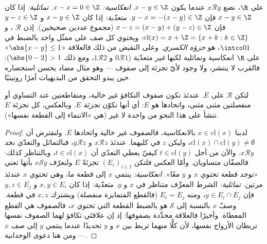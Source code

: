 \begin{example}\label{ex:b1:logic:fracpart}
على $\R$، نضع $x \mathbin{\mathcal{R}} y$ عندما يكون $x - y \in \Z$.
\emph{انعكاسية:} $x - x = 0 \in \Z$. \emph{تماثلية:} إذا كان $x - y
\in \Z$ فإن $y - x = -(x - y) \in \Z$. \emph{متعدّية:} إذا كان $x -
y \in \Z$ و $y - z \in \Z$ فإن $x - z = (x - y) + (y - z) \in
\Z$ (مجموع عددين صحيحين). إذن $\mathcal R$ ، و$\mathrm{cl}(x) = x + \Z = \{x + k : k \in \Z\}$:
ويحتوي كل صف على ممثّل واحد بالضبط في $\intco01$، هو
\emph{جزؤه الكسري}. وعلى النقيض من ذلك فالعلاقة «$\abs{x - y}
\leq 1$» على $\R$ انعكاسية وتماثلية لكنها \emph{غير}
متعدّية ($0 \mathbin{\mathcal R} 1$ و $1 \mathbin{\mathcal R}
2$، ومع ذلك $\abs{0 - 2} > 1$): فالقرب لا ينتشر، ولا وجود
لأيّ تجزئة إلى صفوف --- وهو مثال مضاد يحسن استحضاره حين يبدو
التحقق من البديهيات أمرًا روتينيًا.
\end{example}

\begin{theorem}\label{thm:b1:logic:partition}
لتكن $\mathcal{R}$  على $E$. عندئذ تكون صفوف التكافؤ
غير خالية، ومتقاطعتين عند التساوي أو منفصلتين مثنى مثنى، واتحادها
هو $E$: أي أنها تكوّن \emph{تجزئة}  $E$.
وبالعكس، كل تجزئة  $E$ تنشأ على هذا النحو من  واحدة
لا غير (هي «الانتماء إلى القطعة نفسها»).
\end{theorem}

\begin{proof}
لدينا $x \in \mathrm{cl}(x)$ بالانعكاسية، فالصفوف غير خالية
واتحادها $E$. ولنفترض أن $\mathrm{cl}(x) \cap \mathrm{cl}(y) \neq \emptyset$،
وليكن $z$ في كليهما. عندئذ $x \mathbin{\mathcal{R}} z$ و $y
\mathbin{\mathcal{R}} z$، فبالتماثل والتعدّي نجد $x
\mathbin{\mathcal{R}} y$. والآن من أجل $t \in \mathrm{cl}(y)$ كيفيّ
يعطي التعدّي أن $t \in \mathrm{cl}(x)$، وبالتناظر كذلك: فالصفّان
متساويان. وأمّا العكس فلتكن $(E_i)_{i \in I}$ تجزئةً  $E$ ولنعرّف $x \mathbin{\mathcal S} y$ بأنها تعني
«توجد قطعة تحتوي $x$ و $y$ معًا». \emph{انعكاسية:} ينتمي $x$
إلى قطعة ما، وهي تحتوي $x$ عندئذ مرتين. \emph{تماثلية:} الشرط
المعرِّف متناظر في $x$ و $y$. \emph{متعدّية:} إذا كان
$x, y \in E_i$ و $y, z \in E_j$ فإن $y \in E_i \cap E_j$، ومنه
$E_i = E_j$ (فالقطع المتمايزة منفصلة) ويشترك $x, z$ في قطعة.
وصفّ $x$ بالنسبة إلى $\mathcal S$ هو بالضبط القطعة التي تحتوي
$x$، فالصفوف هي القطع المعطاة. وأخيرًا فالعلاقة محدَّدة بصفوفها:
إذ إن علاقتَي تكافؤ لهما الصفوف نفسها تربطان الأزواج نفسها، لأن
كلًّا منهما تربط بين $x$ و $y$ تحديدًا عندما ينتمي $y$ إلى صف $x$
--- ومن هنا دعوى الوحدانية.
\end{proof}

